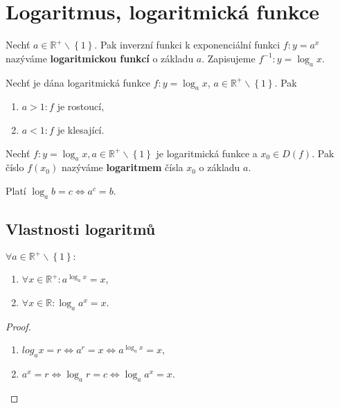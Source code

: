 \section{Logaritmus, logaritmická funkce}
\begin{definition}
    Nechť $a \in \mathbb R^+ \smallsetminus\left \{ 1 \right \} $. Pak inverzní
    funkci k exponenciální funkci $f:y=a^x$ nazýváme \textbf{logaritmickou
    funkcí} o základu $a$. Zapisujeme $f^{-1}: y=\log_a x.$
\end{definition}

\begin{veta}
    Nechť je dána logaritmická funkce $f:y=\log_a x$, $a \in \mathbb R^+ \smallsetminus
    \left \{ 1 \right \} $. Pak
    \begin{enumerate}[$i.$]
        \item $a>1: f$ je rostoucí,
       	\item $a < 1: f$ je klesající.
    \end{enumerate}
\end{veta}

\begin{definition}
    Nechť $f: y=\log_a x, a \in \mathbb R^+ \smallsetminus \left \{ 1 \right \}$ je
    logaritmická funkce a $x_0\in D(f).$ Pak číslo $f(x_0)$ nazýváme
    \textbf{logaritmem} čísla $x_0$ o základu $a.$
\end{definition}

\begin{pozn}
    Platí $\log_a b=c \iff a^c = b.$
\end{pozn}

\subsection*{Vlastnosti logaritmů}
\begin{veta}
    $\forall a \in \mathbb R^+ \smallsetminus \left \{ 1 \right \}:$
    \begin{enumerate}[$i.$]
        \item $\forall x \in \mathbb R^+: a^{\log_a x}=x$,
       	\item $\forall x \in \mathbb R: \log_a a^x=x$.
    \end{enumerate}
\end{veta}

\begin{proof}
    \,
    \begin{enumerate}[$i.$]
        \item $log_a x = r \iff a^r = x \iff a^{\log_a x}=x,$
       	\item $a^x = r \iff \log_a r=c \iff \log_a a^x = x.$ \qedhere
    \end{enumerate}
\end{proof}

